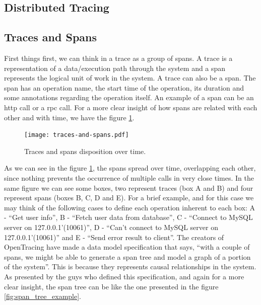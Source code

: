 \subsection{Distributed Tracing}
\label{subsec:distributed_tracing}


\subsection{Traces and Spans}
\label{subsec:traces_and_spans}

First things first, we can think in a trace as a group of spans. A trace is a representation of a data/execution path through the system and a span represents the logical unit of work in the system. A trace can also be a span. The span has an operation name, the start time of the operation, its duration and some annotations regarding the operation itself. An example of a span can be an \gls{http} call or a \gls{rpc} call. For a more clear insight of how spans are related with each other and with time, we have the figure \ref{fig:traces_and_spans_disposition_over_time}.

\begin{figure}[H]
    \centering
    \texttt{[image: traces-and-spans.pdf]}
    \caption{Traces and spans disposition over time.}
    \label{fig:traces_and_spans_disposition_over_time}
\end{figure}

As we can see in the figure \ref{fig:traces_and_spans_disposition_over_time}, the spans spread over time, overlapping each other, since nothing prevents the occurrence of multiple calls in very close times. In the same figure we can see some boxes, two represent traces (box A and B) and four represent spans (boxes B, C, D and E). For a brief example, and for this case we may think of the following cases to define each operation inherent to each box: A - ``Get user info'', B - ``Fetch user data from database'', C - ``Connect to MySQL server on 127.0.0.1'(10061)'', D - ``Can't connect to MySQL server on 127.0.0.1'(10061)'' and E - ``Send error result to client''. The creators of OpenTracing have made a data model specification that says, ``with a couple of spans, we might be able to generate a span tree and model a graph of a portion of the system''\cite{open_tracing_data_model_specification}. This is because they represents causal relationships in the system. As presented by the guys who defined this specification, and again for a more clear insight, the span tree can be like the one presented in the figure \ref{fig:span_tree_example}.


